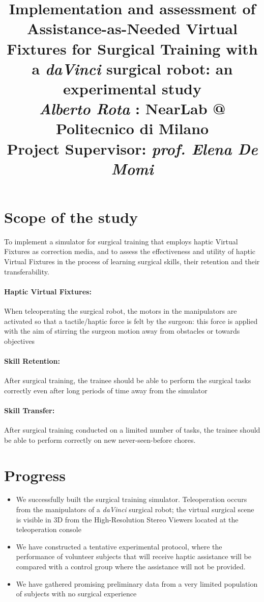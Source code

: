\documentclass{article}
\title{\textbf{Implementation and assessment of Assistance-as-Needed Virtual Fixtures for Surgical Training with a \textit{daVinci} surgical robot: an experimental study}
\\
\vspace{0.5cm}\large{\textit{Alberto Rota} : NearLab @ Politecnico di Milano}
\\
\vspace{0.4cm}\small{Project Supervisor: \textit{prof. Elena De Momi}}
}
\author{}
\date{}
\begin{document}
\maketitle

\section{Scope of the study}
To implement a simulator for surgical training that employs haptic Virtual Fixtures as correction media, and to assess the effectiveness and utility of haptic Virtual Fixtures in the process of learning surgical skills, their retention and their transferability.

\paragraph*{Haptic Virtual Fixtures:} When teleoperating the surgical robot, the motors in the manipulators are activated so that a tactile/haptic force is felt by the surgeon: this force is applied with the aim of stirring the surgeon motion away from obstacles or towards objectives
\paragraph*{Skill Retention:} After surgical training, the trainee should be able to perform the surgical tasks correctly even after long periods of time away from the simulator
\paragraph*{Skill Transfer:} After surgical training conducted on a limited number of tasks, the trainee should be able to perform correctly on new never-seen-before chores.

\section{Progress}
\begin{itemize}
  \item  We successfully built the surgical training simulator. Teleoperation occurs from the manipulators of a \textit{daVinci} surgical robot; the virtual surgical scene is visible in 3D from the High-Resolution Stereo Viewers located at the teleoperation console
  \item We have constructed a tentative experimental protocol, where the performance of volunteer subjects that will receive haptic assistance will be compared with a control group where the assistance will not be provided.
  \item We have gathered promising preliminary data from a very limited population of subjects with no surgical experience
\end{itemize}
\end{document}
